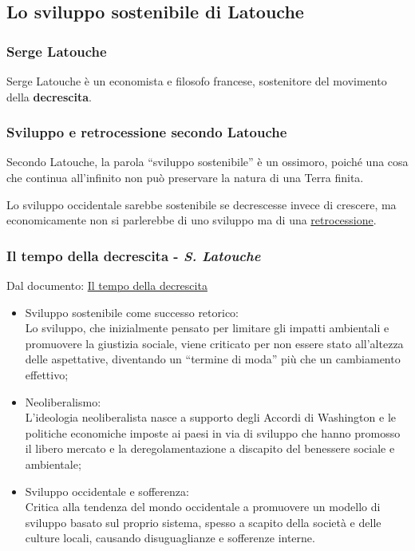 \documentclass{article}
\begin{document}
\subsection{Lo sviluppo sostenibile di Latouche}
\subsubsection{Serge Latouche}
Serge Latouche è un economista e filosofo francese, sostenitore del movimento della 
\textbf{decrescita}.

\subsubsection{Sviluppo e retrocessione secondo Latouche}
Secondo Latouche, la parola ``sviluppo sostenibile'' è un ossimoro, poiché una cosa che
continua all'infinito non può preservare la natura di una Terra finita.

Lo sviluppo occidentale sarebbe sostenibile se decrescesse invece di crescere, ma economicamente
non si parlerebbe di uno sviluppo ma di una \underline{retrocessione}.

\subsubsection{Il tempo della decrescita - \textit{S. Latouche}}
Dal documento: \href{https://github.com/matteofrongillo/passerella/blob/main/Geografia/media/021_Latouche Estratto 40 segg.pdf?raw=true}
{Il tempo della decrescita}
\begin{itemize}
    \item Sviluppo sostenibile come successo retorico:\\
        Lo sviluppo, che inizialmente pensato per limitare gli impatti ambientali e promuovere
        la giustizia sociale, viene criticato per non essere stato all'altezza delle
        aspettative, diventando un ``termine di moda'' più che un cambiamento effettivo;
    \item Neoliberalismo:\\
        L'ideologia neoliberalista nasce a supporto degli Accordi di Washington e le politiche
        economiche imposte ai paesi in via di sviluppo che hanno promosso il libero mercato e
        la deregolamentazione a discapito del benessere sociale e ambientale;
    \item Sviluppo occidentale e sofferenza:\\
        Critica alla tendenza del mondo occidentale a promuovere un modello di sviluppo basato
        sul proprio sistema, spesso a scapito della società e delle culture locali, causando
        disuguaglianze e sofferenze interne.
\end{itemize}
\end{document}
